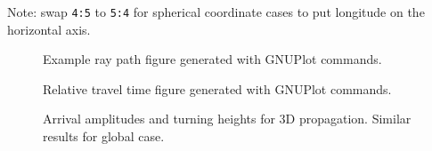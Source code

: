 \documentclass[10pt]{article}
\begin{document}
Note: swap \verb=4:5= to \verb=5:4= for spherical coordinate cases to put longitude on the horizontal axis.

\begin{figure}[h]
\centering
{}
\caption[Ray Path Figure]{Example ray path figure generated with GNUPlot commands.}
\end{figure}

\begin{figure}
\centering
{}
\caption[Travel Time Figure]{Relative travel time figure generated with GNUPlot commands.}
\end{figure}

\begin{figure}
\centering
{}
\caption[Travel Time Figure]{Arrival amplitudes and turning heights for 3D propagation.  Similar results for global case.}
\end{figure}
\end{document}
